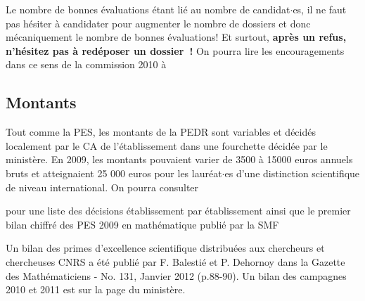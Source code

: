 
Le nombre de bonnes \'evaluations \'etant li\'e au nombre de candidat$\cdot$es, il ne faut pas h\'esiter \`a candidater
pour augmenter le nombre de dossiers et donc m\'ecaniquement le nombre de bonnes \'evaluations! Et surtout,
\textbf{apr\`es un refus, n'h\'esitez pas \`a red\'eposer un dossier~!} On pourra lire les encouragements dans ce sens de la commission 2010 \`a 


\subsection{Montants}

Tout comme la PES, les montants de la PEDR sont variables et d\'ecid\'es localement par le CA de l'\'etablissement dans une fourchette d\'ecid\'ee par le minist\`ere. En 2009, les montants pouvaient varier de 3500  \`a 15000 euros annuels bruts  et atteignaient  25 000 euros pour les laur\'eat$\cdot$es d'une distinction scientifique de niveau international. 
On pourra consulter


pour une liste des d\'ecisions \'etablissement par \'etablissement ainsi que le premier bilan chiffr\'e des PES  2009
en math\'ematique publi\'e par la SMF



Un bilan des primes d'excellence scientifique distribu\'ees aux chercheurs et chercheuses CNRS a \'et\'e publi\'e par F. Balesti\'e et P. Dehornoy dans la Gazette des Math\'ematiciens - No. 131, Janvier 2012 (p.88-90).
Un bilan des campagnes 2010 et 2011 est sur la page du minist\`ere.


